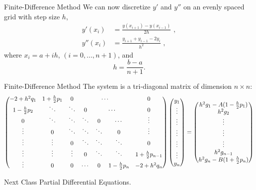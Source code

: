 \documentclass[11pt]{beamer}
\begin{document}
\begin{frame}[fragile]{Finite-Difference Method}
We can now discretize $y'$ and $y''$ on an evenly spaced grid with
step size $h$,
\begin{equation}
\begin{aligned}
y'(x_i) &= \frac{y(x_{i+1}) - y(x_{i-1})}{2h}\,\,,\\
y''(x_i) &= \frac{y_{i+1} + y_{i-1} - 2 y_i}{h^2}\,\,,
\end{aligned}
\end{equation}
where $x_i = a + i h$, $(i = 0, ... , n+1)$, and 
\begin{equation}
h = \frac{b-a}{n+1}.
\end{equation}
\end{frame}

\begin{frame}[fragile]{Finite-Difference Method}
The system is a tri-diagonal matrix of dimension $n \times n$:
\tiny
\begin{equation}
\begin{pmatrix}
-2+h^2q_1 & 1+ \frac{h}{2}p_1& 0 &\multicolumn{3}{c}{\cdots} &0\\
1-\frac{h}{2} p_2&\ddots&\ddots & 0 &\multicolumn{2}{c}{\cdots} & 0\\
0 & \ddots & \ddots & \ddots & 0 & \cdots & \vdots\\
\vdots & 0 & \ddots & \ddots & \ddots & 0 & \vdots \\
\vdots & \vdots & 0 & \ddots & \ddots & \ddots & 0\\
\vdots & \vdots & \vdots& 0& \ddots & \ddots & 1+\frac{h}{2}p_{n-1}\\
\vdots & 0 & 0 & \cdots & 0 & 1-\frac{h}{2} p_n & -2+h^2 q_n\\
\end{pmatrix}
\begin{pmatrix}
y_1\\\vdots \\\vdots \\\vdots \\\vdots \\\vdots \\ y_n
\end{pmatrix}
= \begin{pmatrix}
h^2 g_1 - A(1-\frac{h}{2}p_1)\\
h^2 g_2\\
\vdots\\
\vdots\\
\vdots\\
h^2 g_{n-1}\\
h^2 g_n - B(1+\frac{h}{2}p_n)\\
\end{pmatrix}
\end{equation}
\end{frame}



\begin{frame}[fragile]{Next Class}
Partial Differential Equations.
\end{frame}
\end{document}
